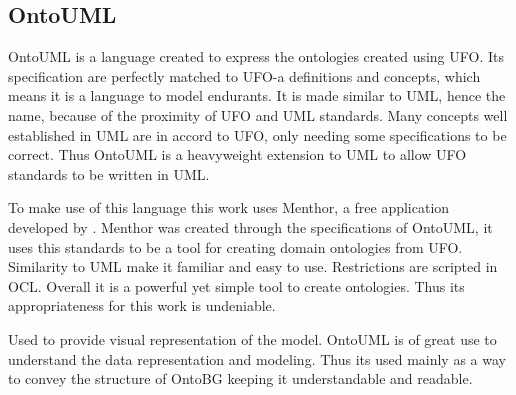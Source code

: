 \subsection{OntoUML}


OntoUML is a language created to express the ontologies created using UFO. Its specification are perfectly matched to UFO-a definitions and concepts, which means it is a language to model endurants. It is made similar to UML, hence the name, because of the proximity of UFO and UML standards. Many concepts well established in UML are in accord to UFO, only needing some specifications to be correct. Thus OntoUML is a heavyweight extension to UML to allow UFO standards to be written in UML. 

To make use of this language this work uses Menthor, a free application developed by \citeauthor{guizzardi_ontological_2005}. Menthor was created through the specifications of OntoUML, it uses this standards to be a tool for creating domain ontologies from UFO. Similarity to UML make it familiar and easy to use. Restrictions are scripted in OCL. Overall it is a powerful yet simple tool to create ontologies. Thus its appropriateness for this work is undeniable.

Used to provide visual representation of the model. OntoUML is of great use to understand the data representation and modeling. Thus its used mainly as a way to convey the structure of OntoBG keeping it understandable and readable.